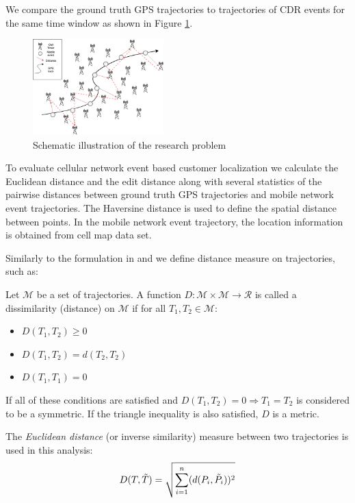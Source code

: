 We compare the ground truth GPS trajectories to trajectories of CDR events for the same time window as shown in Figure \ref{fig:problem}. 
\begin{figure}[h]
    \centering
    \includegraphics[width=0.45\textwidth]{images/problem.png}
    \caption{Schematic illustration of the research problem}
    \label{fig:problem}
\end{figure}

To evaluate cellular network event based customer localization we calculate the Euclidean distance and the edit distance along with several statistics of the pairwise distances between ground truth GPS trajectories and mobile network event trajectories. The Haversine distance is used to define the spatial distance between points. In the mobile network event trajectory, the location information is obtained from cell map data set.

Similarly to the formulation in \cite{encyclopedia} and \cite{distance-def} we define distance measure on trajectories, such as:
\begin{definition}
Let $\mathcal{M}$ be a set of trajectories. A function $D :\mathcal{M} \times \mathcal{M} \rightarrow \mathcal{R}$  is called a dissimilarity (distance) on $\mathcal{M}$ if for all $T_{1}, T_{2} \in \mathcal{M}$: 
\begin{itemize}
    \item $D(T_{1},T_{2}) \geqslant 0$
    \item $D(T_{1},T_{2}) = d(T_{2},T_{2})$
    \item $D(T_{1},T_{1}) = 0$
\end{itemize}
If all of these conditions are satisfied and $D(T_{1}, T_{2}) = 0 \Rightarrow  T_{1} = T_{2} $ is considered to be a symmetric. If
the triangle inequality is also satisfied, $D$ is a metric.
\end{definition}

The \textit{Euclidean distance} (or inverse similarity) measure between two trajectories is used in this analysis:
\[D(T,\Tilde{T}) = \sqrt{\sum_{i=1}^{n} (d(P_{i},\Tilde{P_{i}}))^{2}}\]

